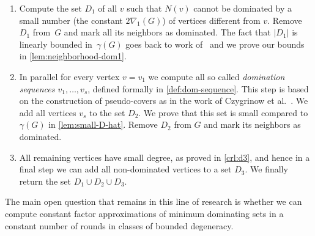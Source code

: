 \begin{enumerate}
\item Compute the set $D_1$ of all $v$ such that $N(v)$ cannot be
dominated by a small number (the constant $2\nabla_1(G)$) of vertices different from $v$.
Remove~$D_1$ from~$G$ and mark all its neighbors as dominated.
The fact that $|D_1|$ is linearly bounded in~$\gamma(G)$ goes back to work
of~\cite{lenzen2013distributed} and we prove our bounds in \cref{lem:neighborhood-dom1}.
\item In parallel for every vertex $v=v_1$ we compute all so called
\emph{domination sequences $v_1,\ldots, v_s$}, defined formally
in \cref{def:dom-sequence}. This step is based on the construction of
pseudo-covers as in the work of Czygrinow et al.~\cite{czygrinow2018distributed}.
We add all vertices $v_s$ to the set
$D_2$. We prove that this set is small compared to~$\gamma(G)$ in \cref{lem:small-D-hat}. Remove $D_2$ from $G$ and mark its neighbors as
dominated.
\item All remaining vertices have small degree, as proved in \cref{crl:d3}, and hence
in a final step we can add all non-dominated vertices to a set $D_3$. We finally
return the set $D_1\cup D_2\cup D_3$.
\end{enumerate}

The main
open question that remains in this line of research is whether we can
compute constant factor approximations of minimum dominating sets
in a constant number of rounds in classes of bounded degeneracy.
